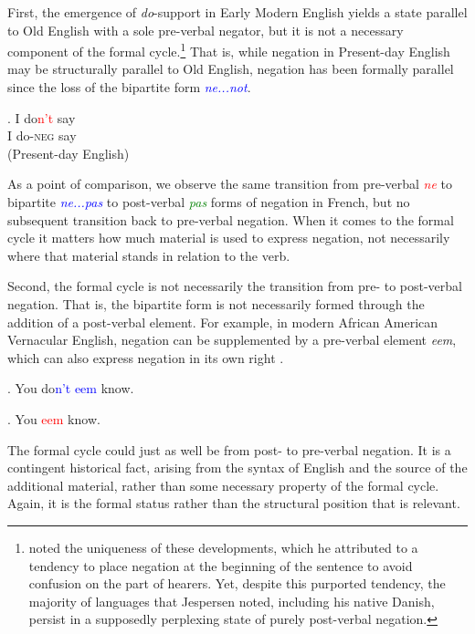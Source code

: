 \documentclass[linguex]{sp}
\theoremstyle{definition} \newtheorem{definition}{Definition}
\begin{document}
First, the emergence of \emph{do}-support in Early Modern English yields a state parallel to Old English with a sole pre-verbal negator, but it is not a necessary component of the formal cycle.\footnote{\citet[10]{jespersen:1917} noted the uniqueness of these developments, which he attributed to a tendency to place negation at the beginning of the sentence to avoid confusion on the part of hearers. Yet, despite this purported tendency, the majority of languages that Jespersen noted, including his native Danish, persist in a supposedly perplexing state of purely post-verbal negation.} That is, while negation in Present-day English may be structurally parallel to Old English, negation has been formally parallel since the loss of the bipartite form \emph{\textcolor{blue}{ne...not}}.

\exg. I do\textcolor{red}{n't} say\\
      I do-\textsc{neg} say\\
      (Present-day English)

As a point of comparison, we observe the same transition from pre-verbal \emph{\textcolor{red}{ne}} to bipartite \emph{\textcolor{blue}{ne...pas}} to post-verbal \emph{\textcolor{green}{pas}} forms of negation in French, but no subsequent transition back to pre-verbal negation. When it comes to the formal cycle it matters how much material is used to express negation, not necessarily where that material stands in relation to the verb.

Second, the formal cycle is not necessarily the transition from pre- to post-verbal negation. That is, the bipartite form is not necessarily formed through the addition of a post-verbal element. For example, in modern African American Vernacular English, negation can be supplemented by a pre-verbal element \emph{eem}, which can also express negation in its own right \citep{jones2015}.

\ex. You do\textcolor{blue}{n't eem} know.

\ex. You \textcolor{red}{eem} know.

The formal cycle could just as well be from post- to pre-verbal negation. It is a contingent historical fact, arising from the syntax of  English and the source of the additional  material, rather than some necessary property of the formal cycle. Again, it is the formal status rather than the structural position that is relevant.
\end{document}
